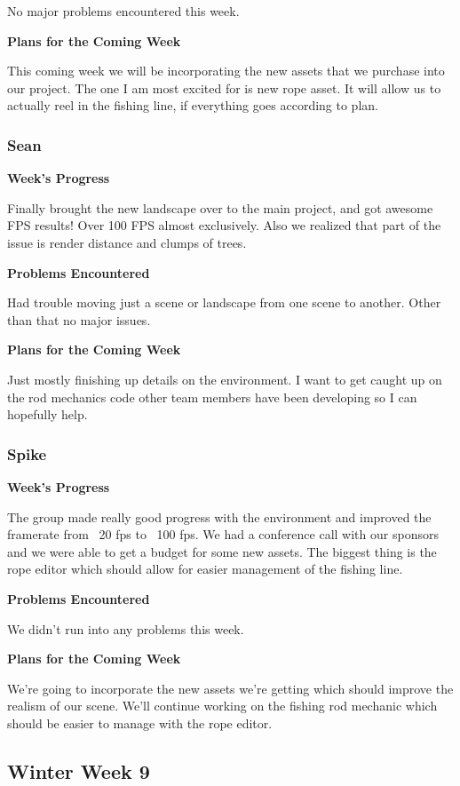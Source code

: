 \documentclass[10pt,journal,compsoc,onecolumn, draftclsnofoot]{IEEEtran}
\begin{document}
No major problems encountered this week.

\noindent \textbf{Plans for the Coming Week}

This coming week we will be incorporating the new assets that we purchase into our project. The one I am most excited for is new rope asset. It will allow us to actually reel in the fishing line, if everything goes according to plan.

\subsubsection{Sean}
\noindent \textbf{Week's Progress}

Finally brought the new landscape over to the main project, and got awesome FPS results! Over 100 FPS almost exclusively. Also we realized that part of the issue is render distance and clumps of trees.

\noindent \textbf{Problems Encountered}

Had trouble moving just a scene or landscape from one scene to another.  Other than that no major issues.

\noindent \textbf{Plans for the Coming Week}

Just mostly finishing up details on the environment. I want to get caught up on the rod mechanics code other team members have been developing so I can hopefully help.

\subsubsection{Spike}
\noindent \textbf{Week's Progress}

The group made really good progress with the environment and improved the framerate from ~20 fps to ~100 fps. We had a conference call with our sponsors and we were able to get a budget for some new assets. The biggest thing is the rope editor which should allow for easier management of the fishing line.

\noindent \textbf{Problems Encountered}

We didn't run into any problems this week.

\noindent \textbf{Plans for the Coming Week}

We're going to incorporate the new assets we're getting which should improve the realism of our scene. We'll continue working on the fishing rod mechanic which should be easier to manage with the rope editor.

\subsection{Winter Week 9}
\end{document}
